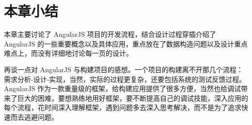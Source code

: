 \section{本章小结}
  \label{sec:开发流程小结}
    本章主要讨论了 AngularJS 项目的开发流程，结合设计过程穿插介绍了 AngularJS 的一些重要概念以及具体应用，重点放在了数据构造问题以及设计重点难点上，而没有详细地讨论每一页的设计。
    \par
    再谈一点对 AngularJS 与构建项目的感想。一个项目的构建离不开那几个流程：需求分析-设计-实现，当然，实际的过程更复杂，还要包括系统的测试反馈过程。AngularJS 作为一款重量级的框架，给构建应用提供了很多方便，当然也给调试带来了巨大的困难，要想熟练地用好框架，要不断提高自己的调试技能，深入应用的每个流程，花时间深入理解框架，遇到问题多去深入思考解决，而不是为了追求快速而去逃避问题。
